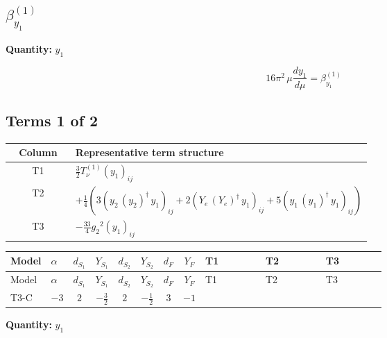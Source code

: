 \documentclass[8pt]{article}
\begin{document}
\begin{landscape}
\section*{$\beta_{y_1}^{(1)}$}
\noindent\textbf{Quantity: }$y_1$\par\smallskip
\[16\pi^2\,\mu\frac{d y_1}{d\mu}=\beta_{y_1}^{(1)}\]
\subsection*{Terms 1 of 2}
\begin{center}
\begin{tabular}{@{}c >{\raggedright\arraybackslash}p{0.82\linewidth}@{}}
\toprule
Column & Representative term structure \\
\midrule
T1 & \(\displaystyle \frac{3}{2} T_{\nu}^{(1)} \left({y_1}\right)_{ij}\) \\
\midrule
T2 & \(\displaystyle +\frac{1}{4} (3 \left({y_2}\,\left({y_2}\right)^{\dagger}\,{y_1}\right)_{ij}+2 \left({Y_e}\,\left({Y_e}\right)^{\dagger}\,{y_1}\right)_{ij}+5 \left({y_1}\,\left({y_1}\right)^{\dagger}\,{y_1}\right)_{ij})\) \\
\midrule
T3 & \(\displaystyle -\frac{33}{4} {g_2}^2 \left({y_1}\right)_{ij}\) \\
\midrule
\bottomrule
\end{tabular}
\end{center}
\smallskip
\tiny
\begin{longtable}{@{}llcccccc >{\raggedright\arraybackslash}p{0.21\linewidth} >{\raggedright\arraybackslash}p{0.21\linewidth} >{\raggedright\arraybackslash}p{0.21\linewidth}@{}}
\toprule
Model & $\alpha$ & $d_{S_1}$ & $Y_{S_1}$ & $d_{S_2}$ & $Y_{S_2}$ & $d_F$ & $Y_F$ & T1 & T2 & T3 \\
\midrule
\endfirsthead
\toprule
Model & $\alpha$ & $d_{S_1}$ & $Y_{S_1}$ & $d_{S_2}$ & $Y_{S_2}$ & $d_F$ & $Y_F$ & T1 & T2 & T3 \\
\midrule
\endhead
T3-C & $-3$ & $2$ & $-\frac{3}{2}$ & $2$ & $-\frac{1}{2}$ & $3$ & $-1$ & \scriptsize\adjustbox{max width=\linewidth}{$\begin{gathered} \frac{3}{2} T_{\nu}^{(1)} \left({y_1}\right)_{ij}\end{gathered}$} & \scriptsize\adjustbox{max width=\linewidth}{$\begin{gathered} +\frac{1}{4} (3 \left({y_2}\,\left({y_2}\right)^{\dagger}\,{y_1}\right)_{ij}+2 \left({Y_e}\,\left({Y_e}\right)^{\dagger}\,{y_1}\right)_{ij}+5 \left({y_1}\,\left({y_1}\right)^{\dagger}\,{y_1}\right)_{ij})\end{gathered}$} & \scriptsize\adjustbox{max width=\linewidth}{$\begin{gathered} -\frac{33}{4} {g_2}^2 \left({y_1}\right)_{ij}\end{gathered}$} \\
\midrule
\bottomrule
\end{longtable}
\clearpage
\noindent\textbf{Quantity: }$y_1$\par\smallskip

\end{landscape}
\end{document}
